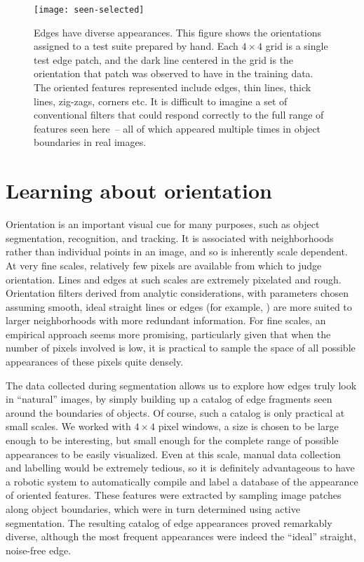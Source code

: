 
\begin{figure}[bt]
\texttt{[image: seen-selected]}
\caption
{
\label{fig:seen-selected}
%
Edges have diverse appearances.  This figure shows 
the orientations assigned to a test suite
prepared by hand.  Each $4\times 4$ grid is a single test
edge patch, and the dark line centered in the grid is the orientation
that patch was observed to have in the training data.
The oriented features represented
include edges, thin lines, thick lines, zig-zags, corners
etc.  It is difficult to imagine a set of conventional
filters that could respond correctly to the full range of 
features seen here~-- all of which appeared multiple
times in object boundaries in real images.
%
}
\end{figure}


\section{Learning about orientation}

Orientation is an important visual cue for many purposes, such as
object segmentation, recognition, and tracking.  It is associated with
neighborhoods rather than individual points in an image, and so is
inherently scale dependent.  At very fine scales, relatively few
pixels are available from which to judge orientation.
Lines and edges at such scales are extremely pixelated and
rough.
%
Orientation filters derived from analytic considerations, with
parameters chosen assuming smooth, ideal straight lines or edges (for
example, \cite{chen00orientation}) are more suited to larger
neighborhoods with more redundant information.
For fine scales, an empirical approach seems more promising, particularly
given that when the number of pixels involved is low, it is practical
to sample the space of all possible appearances of these pixels 
quite densely.

The data collected during segmentation allows us to explore how edges truly
look in ``natural'' images, by simply building up a catalog of edge
fragments seen around the boundaries of objects.  Of course, such a
catalog is only practical at small scales.  We worked with $4\times 4$
pixel windows, a size is chosen to be large enough to be interesting,
but small enough for the complete range of possible appearances to be
easily visualized.  Even at this scale, manual data collection and
labelling would be extremely tedious, so it is definitely advantageous
to have a robotic system to automatically compile and label a database
of the appearance of oriented features.
%
These features were extracted by sampling image patches
along object boundaries, which were in turn determined 
using active segmentation.
The resulting catalog of edge appearances proved remarkably
diverse, although the most frequent appearances were indeed
the ``ideal'' straight, noise-free edge.

